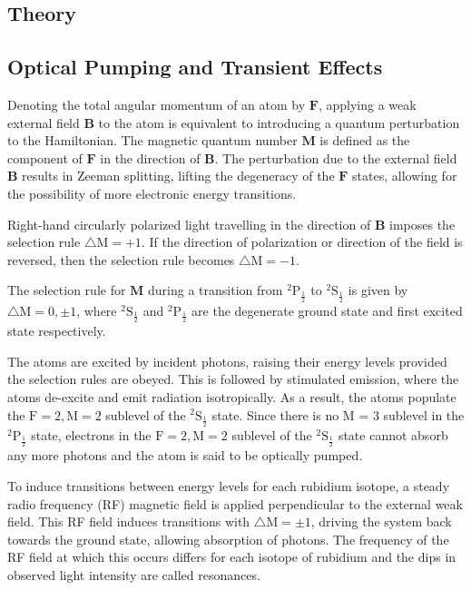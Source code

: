 \documentclass{article}
\begin{document}
\begin{multicols*}{2}
\section{Theory}

\subsection{Optical Pumping and Transient Effects}

Denoting the total angular momentum of an atom by $\textbf{F}$, applying a weak external field $\textbf{B}$ to the atom is equivalent to introducing a quantum perturbation to the Hamiltonian. The magnetic quantum number $\textbf{M}$ is defined as the component of $\textbf{F}$ in the direction of $\textbf{B}$. The perturbation due to the external field $\textbf{B}$ results in Zeeman splitting, lifting the degeneracy of the $\textbf{F}$ states, allowing for the possibility of more electronic energy transitions.


Right-hand circularly polarized light travelling in the direction of $\textbf{B}$ imposes the selection rule  $\mathrm{\triangle M = +1}$. If the direction of polarization or direction of the field is reversed, then the selection rule becomes $\mathrm{\triangle M = -1}$.

The selection rule for $\textbf{M}$ during a  transition from $\mathrm{^{2}P_{\frac{1}{2}}}$ to $\mathrm{^{2}S_{\frac{1}{2}}}$  is given by $\mathrm{\triangle M = 0, \pm 1}$, where $\mathrm{^{2}S_{\frac{1}{2}}}$ and $\mathrm{^{2}P_{\frac{1}{2}}}$ are the degenerate ground state and first excited state respectively.

The atoms are excited by incident photons, raising their energy levels provided the selection rules are obeyed. This is followed by stimulated emission, where the atoms de-excite and emit radiation isotropically. As a result, the atoms populate the $\mathrm{F = 2, M = 2}$ sublevel of the $\mathrm{^{2}S_{\frac{1}{2}}}$ state. Since there is no M = 3 sublevel in the $\mathrm{^{2}P_{\frac{1}{2}}}$ state, electrons in the $\mathrm{F=2, M=2}$ sublevel of the $\mathrm{^{2}S_{\frac{1}{2}}}$ state cannot absorb any more photons and the atom is said to be optically pumped.

To induce transitions between energy levels for each rubidium isotope, a steady radio frequency (RF) magnetic field is applied perpendicular to the external weak field. This RF field induces transitions with $\mathrm{\triangle M = \pm 1}$, driving the system back towards the ground state, allowing absorption of photons. The frequency of the RF field at which this occurs differs for each isotope of rubidium and the dips in observed light intensity are called resonances.


\end{multicols*}
\end{document}
